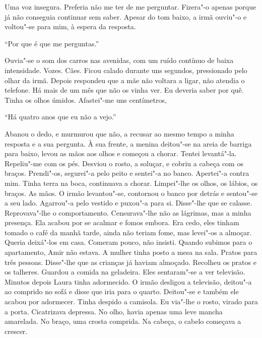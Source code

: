 Uma voz insegura. Preferia não me ter de me perguntar. Fizera"-o apenas
porque já não conseguia continuar sem saber. Apesar do tom baixo, a irmã
ouviu"-o e voltou"-se para mim, à espera da resposta.

``Por que é que me perguntas.''

Ouvia"-se o som dos carros nas avenidas, com um ruído contínuo de baixa
intensidade. Vozes. Cães. Ficou calado durante uns segundos, pressionado
pelo olhar da irmã. Depois respondeu que a mãe não voltara a ligar, não
atendia o telefone. Há mais de um mês que não os vinha ver. Eu deveria
saber por quê. Tinha os olhos úmidos. Afastei"-me uns centímetros,

``Há quatro anos que eu não a vejo.''

Abanou o dedo, e murmurou que não, a recusar ao mesmo tempo a minha
resposta e a sua pergunta. À sua frente, a menina deitou"-se na areia de
barriga para baixo, levou as mãos aos olhos e começou a chorar. Tentei
levantá"-la. Repeliu"-me com os pés. Desviou o rosto, a soluçar, e
cobriu a cabeça com os braços. Prendi"-os, segurei"-a pelo peito e
sentei"-a no banco. Apertei"-a contra mim. Tinha terra na boca,
continuava a chorar. Limpei"-lhe os olhos, os lábios, os braços. As
mãos. O irmão levantou"-se, contornou o banco por detrás e sentou"-se a
seu lado. Agarrou"-a pelo vestido e puxou"-a para si. Disse"-lhe que se
calasse. Reprovava"-lhe o comportamento. Censurava"-lhe não as lágrimas,
mas a minha presença. Ela acabou por se acalmar e fomos embora. Era
cedo, eles tinham tomado o café da manhã tarde, ainda não teriam fome,
mas levei"-os a almoçar. Queria deixá"-los em casa. Comeram pouco, não
insisti. Quando subimos para o apartamento, Amir não estava. A mulher
tinha posto a mesa na sala. Pratos para três pessoas. Disse"-lhe que as
crianças já haviam almoçado. Recolheu os pratos e os talheres. Guardou a
comida na geladeira. Eles sentaram"-se a ver televisão. Minutos depois
Laura tinha adormecido. O irmão desligou a televisão, deitou"-a ao
comprido no sofá e disse que iria para o quarto. Deitou"-se e também ele
acabou por adormecer. Tinha despido a camisola. Eu via"-lhe o rosto,
virado para a porta. Cicatrizava depressa. No olho, havia apenas uma
leve mancha amarelada. No braço, uma crosta comprida. Na cabeça, o
cabelo começava a crescer.

